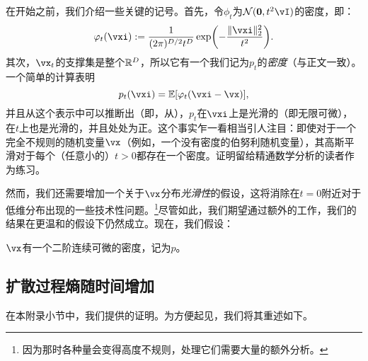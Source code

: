 \documentclass[../../book-main.tex]{subfiles}
\begin{document}
在开始之前，我们介绍一些关键的记号。首先，令\(\phi_{t}\)为\(\dNorm(\vzero, t^{2}\vI)\)的密度，即：
\begin{equation}\label{eq:gaussian_noise_time_t}
    \phi_{t}(\vxi) := \frac{1}{(2\pi)^{D/2}t^{D}}\exp\rp{-\frac{\norm{\vxi}_{2}^{2}}{t^{2}}}.
\end{equation}
其次，\(\vx_{t}\)的支撑集是整个\(\mathbb{R}^{D}\)，所以它有一个我们记为\(p_{t}\)的\textit{密度}（与正文一致）。一个简单的计算表明
\begin{equation}\label{eq:p_t_representation}
    p_{t}(\vxi) = \Ex[\phi_{t}(\vxi - \vx)],
\end{equation}
并且从这个表示中可以推断出（即，从），\(p_{t}\)在\(\vxi\)上是光滑的（即无限可微），在\(t\)上也是光滑的，并且处处为正。这个事实乍一看相当引人注目：即使对于一个完全不规则的随机变量\(\vx\)（例如，一个没有密度的伯努利随机变量），其高斯平滑对于每个（任意小的）\(t > 0\)都存在一个密度。证明留给精通数学分析的读者作为练习。

然而，我们还需要增加一个关于\(\vx\)分布\textit{光滑性}的假设，这将消除在\(t=0\)附近对于低维分布出现的一些技术性问题。\footnote{因为那时各种量会变得高度不规则，处理它们需要大量的额外分析。}尽管如此，我们期望通过额外的工作，我们的结果在更温和的假设下仍然成立。现在，我们假设：
\begin{assumption}\label{assumption:entropy_x_density}
    \(\vx\)有一个二阶连续可微的密度，记为\(p\)。
\end{assumption}


\subsection{扩散过程熵随时间增加}\label{sub:diffusion_entropy_increases}

在本附录小节中，我们提供的证明。为方便起见，我们将其重述如下。
\end{document}

